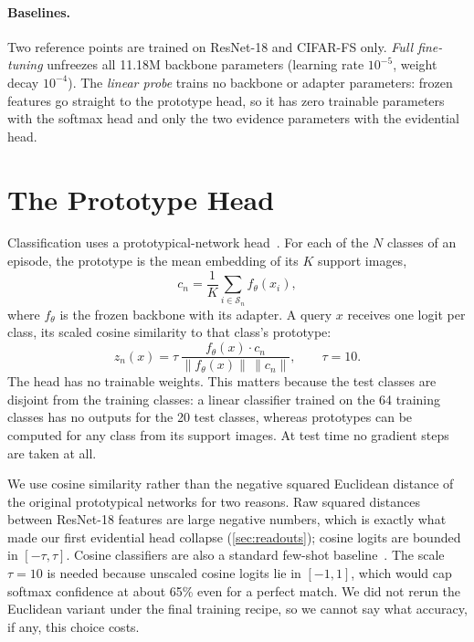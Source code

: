 \paragraph{Baselines.} Two reference points are trained on ResNet-18 and CIFAR-FS only. \emph{Full
fine-tuning} unfreezes all 11.18M backbone parameters (learning rate $10^{-5}$, weight decay $10^{-4}$).
The \emph{linear probe} trains no backbone or adapter parameters: frozen features go straight to the
prototype head, so it has zero trainable parameters with the softmax head and only the two evidence
parameters with the evidential head.

\section{The Prototype Head}
\label{sec:head}

Classification uses a prototypical-network head~\cite{snell2017protonet}. For each of the $N$ classes of
an episode, the prototype is the mean embedding of its $K$ support images,
\begin{equation}
c_n = \frac{1}{K}\sum_{i \in \mathcal{S}_n} f_\theta(x_i),
\end{equation}
where $f_\theta$ is the frozen backbone with its adapter. A query $x$ receives one logit per class, its
scaled cosine similarity to that class's prototype:
\begin{equation}
z_n(x) = \tau \, \frac{f_\theta(x) \cdot c_n}{\lVert f_\theta(x)\rVert\, \lVert c_n \rVert}, \qquad \tau = 10 .
\label{eq:logits}
\end{equation}
The head has no trainable weights. This matters because the test classes are disjoint from the training
classes: a linear classifier trained on the 64 training classes has no outputs for the 20 test classes,
whereas prototypes can be computed for any class from its support images. At test time no gradient steps
are taken at all.

We use cosine similarity rather than the negative squared Euclidean distance of the original prototypical
networks for two reasons. Raw squared distances between ResNet-18 features are large negative numbers,
which is exactly what made our first evidential head collapse (\cref{sec:readouts}); cosine logits are
bounded in $[-\tau, \tau]$. Cosine classifiers are also a standard few-shot baseline~\cite{chen2019closer}.
The scale $\tau = 10$ is needed because unscaled cosine logits lie in $[-1, 1]$, which would cap softmax
confidence at about 65\% even for a perfect match. We did not rerun the Euclidean variant under the final
training recipe, so we cannot say what accuracy, if any, this choice costs.

